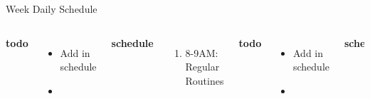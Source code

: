 \documentclass[serif, mathserif, final]{beamer}
\begin{document}
\begin{frame}
\begin{columns}
\begin{column}{0.5\linewidth}
\begin{block}{Week Daily Schedule}
\begin{columns}
        {\small \bf todo}\\ 
        \begin{itemize}
          \tiny \item \tiny Add in schedule
        \item \tiny 
        \end{itemize} 
        \textbf{\small schedule}\\
        \begin{enumerate} 
          \tiny \item \tiny 8-9AM: Regular Routines 
        \end{enumerate} 
        \small{\bf todo}\\ 
        \begin{itemize}
          \tiny \item \tiny Add in schedule
        \item \tiny 
        \end{itemize} 
        {\small \bf schedule}\\
        \begin{enumerate} 
          \tiny \item \tiny 8-9AM: Regular Routines 
        \end{enumerate}


\end{columns}
\end{block}
\end{column}
\end{columns}
\end{frame}
\end{document}
